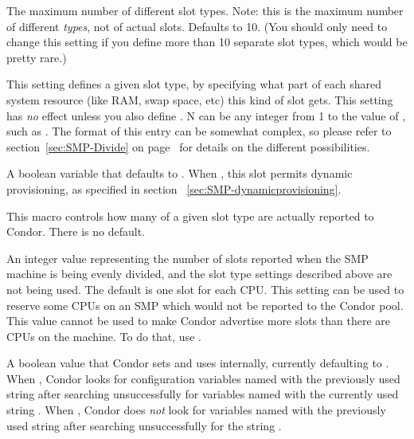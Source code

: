 \begin{description}

\label{param:MaxSlotTypes}
\item[\Macro{MAX\_SLOT\_TYPES}]
  The maximum number of different slot types.  
  Note: this is the maximum number of different \emph{types}, not of
  actual slots.
  Defaults to 10.  
  (You should only need to change this setting if you define more than
  10 separate slot types, which would be pretty rare.)

\label{param:SlotTypeN}
\item[\Macro{SLOT\_TYPE\_<N>}]
  This setting defines a given slot type, by specifying
  what part of each shared system resource (like RAM, swap space, etc)
  this kind of slot gets.  This setting has \emph{no} effect unless you also
  define .
  N can be any integer from 1 to the value of
  , such as
  . 
  The format of this entry can be somewhat complex, so please refer to
  section~\ref{sec:SMP-Divide} on page~\pageref{sec:SMP-Divide} for
  details on the different possibilities.

\label{param:SlotTypeNPartitionable}
\item[\Macro{SLOT\_TYPE\_<N>\_PARTITIONABLE}]
  A boolean variable that defaults to .
  When , this slot permits dynamic provisioning, as specified in
  section~ \ref{sec:SMP-dynamicprovisioning}.

\label{param:NumSlotsTypeN}
\item[\Macro{NUM\_SLOTS\_TYPE\_<N>}]
  This macro controls how many of a given slot type
  are actually reported to Condor.
  There is no default.

\label{param:NumSlots}
\item[\Macro{NUM\_SLOTS}]
  An integer value representing the number of slots reported when
  the SMP machine is being evenly divided, and the slot
  type settings described above are not being used.
  The default is one slot for each CPU.
  This setting can be used to reserve some CPUs on an SMP which would
  not be reported to the Condor pool.
  This value cannot be used to
  make Condor advertise more slots than there are CPUs on the machine.
  To do that, use .

\label{param:AllowVMCruft}
\item[\Macro{ALLOW\_VM\_CRUFT}]
  A boolean value that Condor sets and uses internally, currently
  defaulting to .  When ,
  Condor looks for configuration variables named with the
  previously used string  after searching unsuccessfully
  for variables named with the currently used string .
  When , Condor does \emph{not} look for variables named
  with the previously used string  after searching
  unsuccessfully for the string . 

\end{description}

